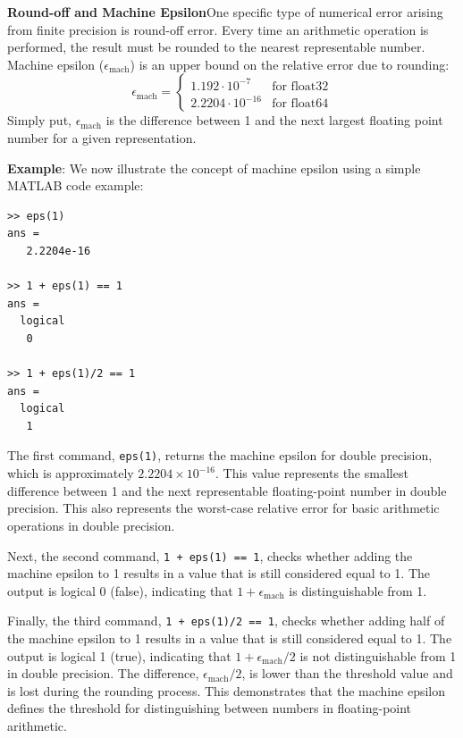 \textbf{Round-off and Machine Epsilon}\quad One specific type of numerical error arising from finite precision is round-off error. Every time an arithmetic operation is performed, the result must be rounded to the nearest representable number. Machine epsilon ($\epsilon_{\text{mach}}$) is an upper bound on the relative error due to rounding:
\begin{equation*}
    \epsilon_{\text{mach}} =
    \begin{cases}
        1.192\cdot 10^{-7} & \text{for float32} \\
        2.2204\cdot 10^{-16} & \text{for float64}
    \end{cases}
\end{equation*}
Simply put, $\epsilon_{\text{mach}}$ is the difference between 1 and the next largest floating point number for a given representation.

\begin{exampleBox}
  \textbf{Example}:
  We now illustrate the concept of machine epsilon using a simple MATLAB code example:
\begin{verbatim}
>> eps(1)
ans =
   2.2204e-16

>> 1 + eps(1) == 1
ans =
  logical
   0

>> 1 + eps(1)/2 == 1
ans =
  logical
   1
\end{verbatim}
  The first command, \texttt{eps(1)}, returns the machine epsilon for double precision, which is approximately \(2.2204 \times 10^{-16}\). This value represents the smallest difference between 1 and the next representable floating-point number in double precision. This also represents the worst-case relative error for basic arithmetic operations in double precision. 

  Next, the second command, \texttt{1 + eps(1) == 1}, checks whether adding the machine epsilon to 1 results in a value that is still considered equal to 1. The output is logical 0 (false), indicating that \(1 + \epsilon_{\text{mach}}\) is distinguishable from 1.

  Finally, the third command, \texttt{1 + eps(1)/2 == 1}, checks whether adding half of the machine epsilon to 1 results in a value that is still considered equal to 1.
  The output is logical 1 (true), indicating that \(1 +{\epsilon_{\text{mach}}}/{2}\) is not distinguishable from 1 in double precision.
  The difference, ${\epsilon_{\text{mach}}}/{2}$, is lower than the threshold value and is lost during the rounding process.
  This demonstrates that the machine epsilon defines the threshold for distinguishing between numbers in floating-point arithmetic.
\end{exampleBox}

